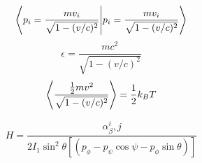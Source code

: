 \begin{question}
        
\end{question}
\begin{answer}
\end{answer}
\begin{question}
        
\end{question}
\begin{answer}
\end{answer}
\begin{question}
        
\end{question}
\begin{answer}
\end{answer}
\begin{question}
        
    \[
        \bra{p_i=\frac{mv_i}{\sqrt{1-(v/c)^2}}}\ket{p_i=\frac{mv_i}{\sqrt{1-(v/c)^2}}}
    \]
    \[
        \epsilon=\frac{mc^2}{\sqrt{1-(v/c)^2}}
    \]
    \[
        \expval{\frac{\frac{1}{2}mv^2}{\sqrt{1-(v/c)^2}}}=\frac{1}{2}k_BT
    \]
\end{question}
\begin{answer}
\end{answer}
\begin{question}
        
\end{question}
\begin{answer}
    \[
        H=\frac{\alpha_\beta^i,j}{2I_1\sin^2{\theta}[(p_\phi-p_\psi\cos{\psi}-p_\phi\sin{\theta})]}
    \]
\end{answer}